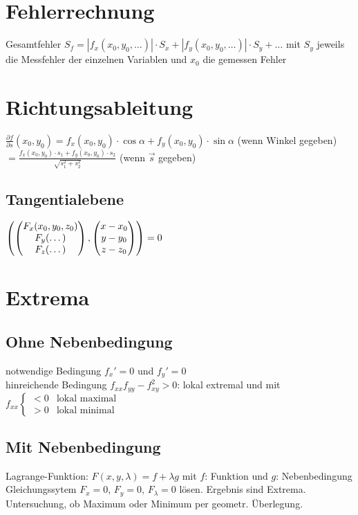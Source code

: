 \section{Fehlerrechnung}
Gesamtfehler $S_f=|f_x(x_0,y_0,\dots)|\cdot S_x+|f_y(x_0,y_0,\dots)|\cdot S_y+\dots$ mit $S_y$ jeweils die Messfehler der einzelnen Variablen und $x_0$ die gemessen Fehler

\section{Richtungsableitung}
$\frac{\partial f}{\partial s} (x_0,y_0) = f_x(x_0,y_0) \cdot \cos \alpha + f_y (x_0,y_0) \cdot \sin \alpha$  (wenn Winkel gegeben)\\
$= \frac{f_x(x_0,y_0) \cdot s_1+f_y (x_0,y_0) \cdot s_2}{\sqrt{s_1^2+s_2^2}}$ (wenn $\vec{s}$ gegeben)

\subsection{Tangentialebene}
$\left(\begin{pmatrix}F_x(x_0,y_0,z_0)\\F_y(\dots)\\F_z(\dots)\end{pmatrix}, \begin{pmatrix}x-x_0\\y-y_0\\z-z_0\end{pmatrix}\right) = 0$

\section{Extrema}
\subsection{Ohne Nebenbedingung}
notwendige Bedingung $f_x'=0$ und $f_y'=0$\\
hinreichende Bedingung $f_{xx}f_{yy}-f_{xy}^2>0$: lokal extremal und mit $f_{xx}\begin{cases}
<0 & \text{lokal maximal}\\
>0 & \text{lokal minimal}
\end{cases}$
\subsection{Mit Nebenbedingung}
Lagrange-Funktion: $F(x,y,\lambda)=f+\lambda g$ mit $f$: Funktion und $g$: Nebenbedingung\\
Gleichungssytem $F_x=0$, $F_y=0$, $F_\lambda =0$ lösen. Ergebnis sind Extrema.\\
Untersuchung, ob Maximum oder Minimum per geometr. Überlegung.

